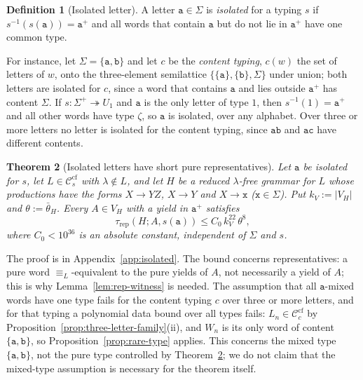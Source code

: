 \documentclass[11pt]{article}
\numberwithin{equation}{section}
\theoremstyle{plain}
\newtheorem{theorem}{Theorem}[section]
\theoremstyle{definition}
\newtheorem{definition}[theorem]{Definition}
\theoremstyle{remark}
\theoremstyle{plain}
\newcommand{\cf}{\mathrm{cf}}
\newcommand{\Ccf}[1]{\mathcal C_{#1}^{\cf}}
\newcommand{\trep}{\tau_{\mathrm{rep}}}
\begin{document}
\begin{definition}[Isolated letter]
\label{def:isolated-letter}
A letter $\mathtt a\in\Sigma$ is \emph{isolated} for a typing $s$ if
$s^{-1}(s(\mathtt a))=\mathtt a^+$ and all words that contain $\mathtt a$ but do
not lie in $\mathtt a^+$ have one common type.
\end{definition}

For instance, let $\Sigma=\{\mathtt a,\mathtt b\}$ and let $c$ be the
\emph{content typing}, $c(w)$ the set of letters of $w$, onto the
three-element semilattice $\{\{\mathtt a\},\{\mathtt b\},\Sigma\}$ under union;
both letters are isolated for $c$, since a word that contains $\mathtt a$ and
lies outside $\mathtt a^+$ has content $\Sigma$.  If $s:\Sigma^+\twoheadrightarrow
U_1$ and $\mathtt a$ is the only letter of type $1$, then $s^{-1}(1)=\mathtt a^+$
and all other words have type $\zeta$, so $\mathtt a$ is isolated, over any
alphabet.  Over three or more letters no letter is isolated for the content
typing, since $\mathtt{ab}$ and $\mathtt{ac}$ have different contents.

\begin{theorem}[Isolated letters have short pure representatives]
\label{thm:isolated-letter}
Let $\mathtt a$ be isolated for $s$, let $L\in\Ccf{s}$ with $\lambda\notin L$, and
let $H$ be a reduced $\lambda$-free grammar for $L$ whose productions have the forms
$X\to YZ$, $X\to Y$ and $X\to\mathtt x$ \textup($\mathtt x\in\Sigma$\textup).  Put
$k_V:=|V_H|$ and $\theta:=\bar\theta_H$.  Every $A\in V_H$ with a yield in
$\mathtt a^+$ satisfies
\[
 \trep(H;A,s(\mathtt a))\le C_0\,k_V^{22}\,\theta^{8},
\]
where $C_0<10^{36}$ is an absolute constant, independent of $\Sigma$ and $s$.
\end{theorem}

The proof is in Appendix~\ref{app:isolated}.  The bound concerns
representatives: a pure word $\equiv_L$-equivalent to the pure yields of $A$,
not necessarily a yield of $A$; this is why Lemma~\ref{lem:rep-witness} is
needed.  The assumption that all $\mathtt a$-mixed words have one type fails for
the content typing $c$ over three or more letters, and for that typing a
polynomial data bound over all types fails: $L_n\in\Ccf{c}$ by
Proposition~\ref{prop:three-letter-family}(ii), and $W_n$ is its only word of
content $\{\mathtt a,\mathtt b\}$, so Proposition~\ref{prop:rare-type} applies.
This concerns the mixed type $\{\mathtt a,\mathtt b\}$, not the pure type
controlled by Theorem~\ref{thm:isolated-letter}; we do not claim that the
mixed-type assumption is necessary for the theorem itself.
\end{document}
